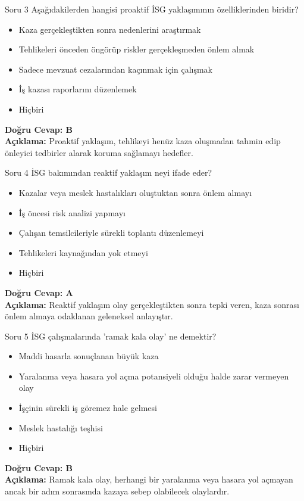 \documentclass[12pt,a4paper]{article}
\begin{document}
\begin{testcard}{Soru 3}
    Aşağıdakilerden hangisi proaktif İSG yaklaşımının özelliklerinden biridir?
    \begin{itemize}
        \item[A)] Kaza gerçekleştikten sonra nedenlerini araştırmak
        \item[B)] Tehlikeleri önceden öngörüp riskler gerçekleşmeden önlem almak
        \item[C)] Sadece mevzuat cezalarından kaçınmak için çalışmak
        \item[D)] İş kazası raporlarını düzenlemek
        \item[E)] Hiçbiri
    \end{itemize}
    \tcblower
    \textbf{Doğru Cevap: B} \\
    \textbf{Açıklama:} Proaktif yaklaşım, tehlikeyi henüz kaza oluşmadan tahmin edip önleyici tedbirler alarak koruma sağlamayı hedefler.
\end{testcard}

\begin{testcard}{Soru 4}
    İSG bakımından reaktif yaklaşım neyi ifade eder?
    \begin{itemize}
        \item[A)] Kazalar veya meslek hastalıkları oluştuktan sonra önlem almayı
        \item[B)] İş öncesi risk analizi yapmayı
        \item[C)] Çalışan temsilcileriyle sürekli toplantı düzenlemeyi
        \item[D)] Tehlikeleri kaynağından yok etmeyi
        \item[E)] Hiçbiri
    \end{itemize}
    \tcblower
    \textbf{Doğru Cevap: A} \\
    \textbf{Açıklama:} Reaktif yaklaşım olay gerçekleştikten sonra tepki veren, kaza sonrası önlem almaya odaklanan geleneksel anlayıştır.
\end{testcard}

\begin{testcard}{Soru 5}
    İSG çalışmalarında 'ramak kala olay' ne demektir?
    \begin{itemize}
        \item[A)] Maddi hasarla sonuçlanan büyük kaza
        \item[B)] Yaralanma veya hasara yol açma potansiyeli olduğu halde zarar vermeyen olay
        \item[C)] İşçinin sürekli iş göremez hale gelmesi
        \item[D)] Meslek hastalığı teşhisi
        \item[E)] Hiçbiri
    \end{itemize}
    \tcblower
    \textbf{Doğru Cevap: B} \\
    \textbf{Açıklama:} Ramak kala olay, herhangi bir yaralanma veya hasara yol açmayan ancak bir adım sonrasında kazaya sebep olabilecek olaylardır.
\end{testcard}
\end{document}

